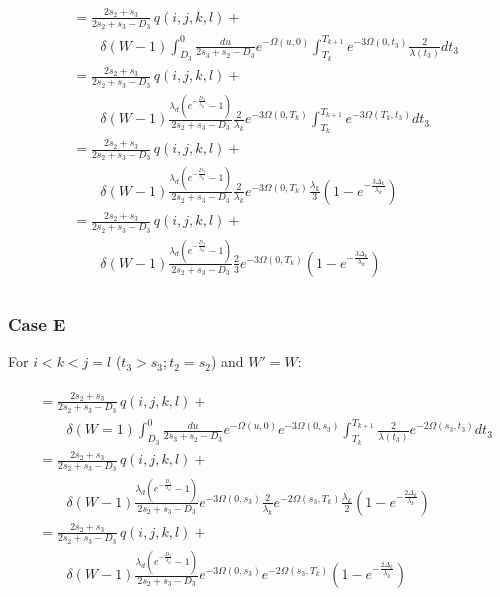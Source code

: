 \documentclass{article}
\begin{document}
\begin{align}
    \begin{split}
        &= \frac{2s_2+s_3}{2s_2+s_3-D_3}\,q(i,j,k,l) +\\
        &\qquad
        \delta(W-1)\int_{D_3}^{0}\frac{du}{2s_3+s_2-D_3}e^{-\Omega(u,0)}\int_{T_k}^{T_{k+1}}e^{-3\Omega(0,t_3)}\frac{2}{\lambda(t_3)}dt_3\\
        &= \frac{2s_2+s_3}{2s_2+s_3-D_3}\,q(i,j,k,l) +\\
        &\qquad
        \delta(W-1)\frac{\lambda_d\left(e^{-\frac{D_3}{\lambda_d}}-1\right)}{2s_2+s_3-D_3}\frac{2}{\lambda_k}e^{-3\Omega(0,T_k)}\int_{T_k}^{T_{k+1}}e^{-3\Omega(T_k,t_3)}dt_3\\
        &= \frac{2s_2+s_3}{2s_2+s_3-D_3}\,q(i,j,k,l) +\\
        &\qquad
        \delta(W-1)\frac{\lambda_d\left(e^{-\frac{D_3}{\lambda_d}}-1\right)}{2s_2+s_3-D_3}\frac{2}{\lambda_k}e^{-3\Omega(0,T_k)}\frac{\lambda_k}{3}\left(1-e^{-\frac{3\Delta_k}{\lambda_k}}\right)\\
        &= \frac{2s_2+s_3}{2s_2+s_3-D_3}\,q(i,j,k,l) +\\
        &\qquad
        \delta(W-1)\frac{\lambda_d\left(e^{-\frac{D_3}{\lambda_d}}-1\right)}{2s_2+s_3-D_3}\frac{2}{3}e^{-3\Omega(0,T_k)}\left(1-e^{-\frac{3\Delta_k}{\lambda_k}}\right)\\
    \end{split}
\end{align}

\subsubsection{Case E}
For $i<k<j=l$ ($t_3>s_3; t_2=s_2$) and $W' = W$:

\begin{align}
    \begin{split}
        &= \frac{2s_2+s_3}{2s_2+s_3-D_3}\,q(i,j,k,l) +\\
        &\qquad
        \delta(W = 1)\int_{D_3}^{0}\frac{du}{2s_3+s_2-D_3}e^{-\Omega(u,0)}e^{-3\Omega(0,s_3)}\int_{T_k}^{T_{k+1}}\frac{2}{\lambda(t_3)}e^{-2\Omega(s_3,t_3)}dt_3\\
        &= \frac{2s_2+s_3}{2s_2+s_3-D_3}\,q(i,j,k,l) +\\
        &\qquad
        \delta(W-1)\frac{\lambda_d\left(e^{-\frac{D_3}{\lambda_d}}-1\right)}{2s_2+s_3-D_3}
        e^{-3\Omega(0,s_3)}\frac{2}{\lambda_k}e^{-2\Omega(s_3,T_k)}\frac{\lambda_k}{2}\left(1-e^{-\frac{2\Delta_k}{\lambda_k}}\right)\\
        &= \frac{2s_2+s_3}{2s_2+s_3-D_3}\,q(i,j,k,l) +\\
        &\qquad
        \delta(W-1)\frac{\lambda_d\left(e^{-\frac{D_3}{\lambda_d}}-1\right)}{2s_2+s_3-D_3}
        e^{-3\Omega(0,s_3)}e^{-2\Omega(s_3,T_k)}\left(1-e^{-\frac{2\Delta_k}{\lambda_k}}\right)\\
    \end{split}
\end{align}
\end{document}
